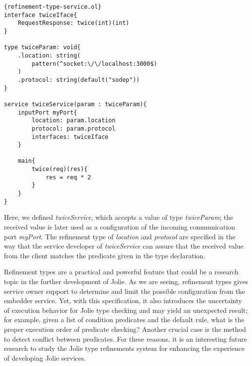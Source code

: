 \begin{listing}[ht]
    \lstset{language=Jolie,
        style=codeStyle,
        numbers=left,
        firstnumber=1
    }
    \begin{lstlisting}[frame=tlrb]{refinement-type-service.ol}
interface twiceIface{
    RequestResponse: twice(int)(int)
}

type twiceParam: void{
    .location: string(
        pattern(^socket:\/\/localhost:3000$)
    )
    .protocol: string(default("sodep"))
}

service twiceService(param : twiceParam){
    inputPort myPort{
        location: param.location
        protocol: param.protocol
        interfaces: twiceIface
    }

    main{
        twice(req)(res){
            res = req * 2
        }
    }
}
\end{lstlisting}
    \caption{Jolie implementation of the twiceService with refinement types}
    \label{fig:jolie-refinement-example}
\end{listing}

Here, we defined \textit{twiceService}, which accepts a value of type \textit{twiceParam}; the received value is later used as a configuration of the incoming communication port \textit{myPort}. The refinement type of \textit{location} and \textit{protocol} are specified in the way that the service developer of \textit{twiceService} can assure that the received value from the client matches the predicate given in the type declaration.

Refinement types are a practical and powerful feature that could be a research topic in the further development of Jolie. As we are seeing, refinement types gives service owner support to determine and limit the possible configuration from the embedder service. Yet, with this specification, it also introduces the uncertainty of execution behavior for Jolie type checking and may yield an unexpected result; for example, given a list of condition predicates and the default rule, what is the proper execution order of predicate checking? Another crucial case is the method to detect conflict between predicates. For these reasons, it is an interesting future research to study the Jolie type refinements system for enhancing the experience of developing Jolie services.

